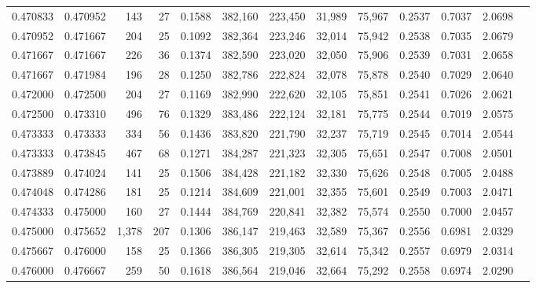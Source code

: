 \begin{tabular}{rrrrrrrrrrrrr}
0.470833 & 0.470952 &   143 &  27 &                                     0.1588 & 382,160 & 223,450 &  31,989 &  75,967 & 0.2537 & 0.7037 & 2.0698 \\
0.470952 & 0.471667 &   204 &  25 &                                     0.1092 & 382,364 & 223,246 &  32,014 &  75,942 & 0.2538 & 0.7035 & 2.0679 \\
0.471667 & 0.471667 &   226 &  36 &                                     0.1374 & 382,590 & 223,020 &  32,050 &  75,906 & 0.2539 & 0.7031 & 2.0658 \\
0.471667 & 0.471984 &   196 &  28 &                                     0.1250 & 382,786 & 222,824 &  32,078 &  75,878 & 0.2540 & 0.7029 & 2.0640 \\
0.472000 & 0.472500 &   204 &  27 &                                     0.1169 & 382,990 & 222,620 &  32,105 &  75,851 & 0.2541 & 0.7026 & 2.0621 \\
0.472500 & 0.473310 &   496 &  76 &                                     0.1329 & 383,486 & 222,124 &  32,181 &  75,775 & 0.2544 & 0.7019 & 2.0575 \\
0.473333 & 0.473333 &   334 &  56 &                                     0.1436 & 383,820 & 221,790 &  32,237 &  75,719 & 0.2545 & 0.7014 & 2.0544 \\
0.473333 & 0.473845 &   467 &  68 &                                     0.1271 & 384,287 & 221,323 &  32,305 &  75,651 & 0.2547 & 0.7008 & 2.0501 \\
0.473889 & 0.474024 &   141 &  25 &                                     0.1506 & 384,428 & 221,182 &  32,330 &  75,626 & 0.2548 & 0.7005 & 2.0488 \\
0.474048 & 0.474286 &   181 &  25 &                                     0.1214 & 384,609 & 221,001 &  32,355 &  75,601 & 0.2549 & 0.7003 & 2.0471 \\
0.474333 & 0.475000 &   160 &  27 &                                     0.1444 & 384,769 & 220,841 &  32,382 &  75,574 & 0.2550 & 0.7000 & 2.0457 \\
0.475000 & 0.475652 & 1,378 & 207 &                                     0.1306 & 386,147 & 219,463 &  32,589 &  75,367 & 0.2556 & 0.6981 & 2.0329 \\
0.475667 & 0.476000 &   158 &  25 &                                     0.1366 & 386,305 & 219,305 &  32,614 &  75,342 & 0.2557 & 0.6979 & 2.0314 \\
0.476000 & 0.476667 &   259 &  50 &                                     0.1618 & 386,564 & 219,046 &  32,664 &  75,292 & 0.2558 & 0.6974 & 2.0290 \\

\end{tabular}

